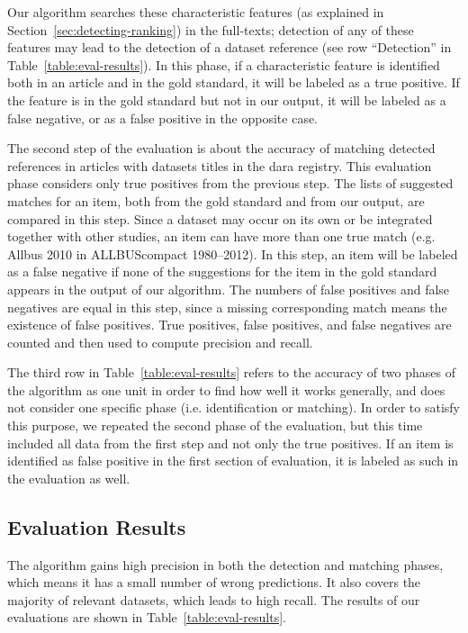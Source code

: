 \documentclass{IOS-Book-Article}
\newcommand{\dara}{\textsf{da\textbar ra}}
\begin{document}
Our algorithm searches these characteristic features (as explained in Section~\ref{sec:detecting-ranking}) in the full-texts; detection of any of these features may lead to the detection of a dataset reference (see row \enquote{Detection} in Table~\ref{table:eval-results}).
In this phase, if a characteristic feature is identified both in an article and in the gold standard, it will be labeled as a true positive.
If the feature is in the gold standard but not in our output, it will be labeled as a false negative, or as a false positive in the opposite case.
 
The second step of the evaluation is about the accuracy of matching detected references in articles with datasets titles in the {\dara} registry.
This evaluation phase considers only true positives from the previous step.
The lists of suggested matches for an item, both from the gold standard and from our output, are compared in this step. 
Since a dataset may occur on its own or be integrated together with other studies,
an item can have more than one true match (e.g. Allbus 2010 in ALLBUScompact 1980--2012).
In this step, an item will be labeled as a false negative if none of the suggestions for the item in the gold standard appears in the output of our algorithm.
The numbers of false positives and false negatives are equal in this step, since a missing corresponding match means the existence of false positives.
True positives, false positives, and false negatives are counted and then used to compute precision and recall.

The third row in Table~\ref{table:eval-results} refers to the accuracy of two phases of the algorithm as one unit in order to find how well it works generally, and does not consider one specific phase (i.e. identification or matching).
In order to satisfy this purpose, we repeated the second phase of the evaluation, but this time included all data from the first step and not only the true positives.
If an item is identified as false positive in the first section of evaluation, it is labeled as such in the evaluation as well.   
 
\subsection{Evaluation Results}
\label{sec:evre}
The algorithm gains high precision in both the detection and matching phases, which means it has a small number of wrong predictions.
It also covers the majority of relevant datasets, which leads to high recall.
The results of our evaluations are shown in Table~\ref{table:eval-results}.
 
\end{document}
